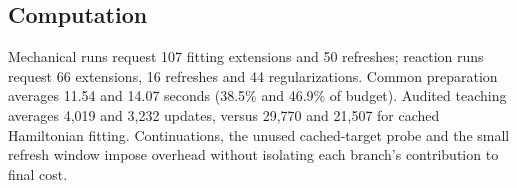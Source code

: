 \subsection{Computation}
Mechanical runs request 107 fitting extensions and 50 refreshes;
reaction runs request 66 extensions, 16 refreshes and 44 regularizations.
Common preparation averages 11.54 and 14.07 seconds (38.5\% and
46.9\% of budget). Audited teaching averages 4,019 and 3,232 updates,
versus 29,770 and 21,507 for cached Hamiltonian fitting. Continuations,
the unused cached-target probe and the small refresh window impose
overhead without isolating each branch's contribution to final cost.
